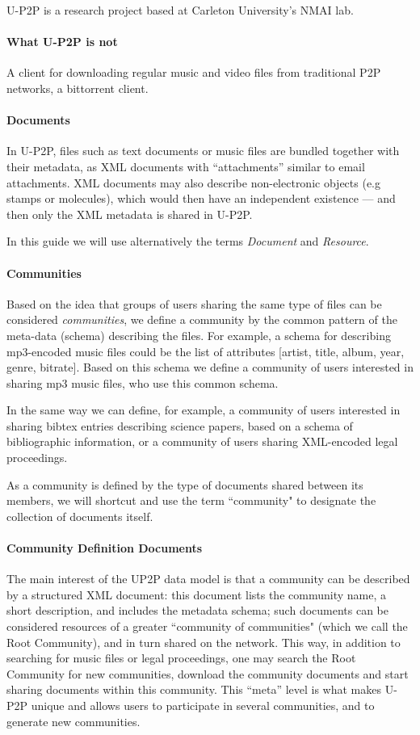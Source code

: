 \documentclass[titlepage]{article}%
\begin{document}
U-P2P is a research project based at Carleton University's NMAI lab.

\paragraph{What U-P2P is not}
A client for downloading regular music and video files from traditional P2P networks, a bittorrent client. 

\paragraph{Documents}
In U-P2P, files such as text documents or music files are bundled together with their metadata, as XML documents with ``attachments'' similar to email attachments. XML documents may also describe non-electronic objects (e.g stamps or molecules), which would then have an independent existence --- and then only the XML metadata is shared in U-P2P.

In this guide we will use alternatively the terms \emph{Document} and \emph{Resource}.

\paragraph{Communities}
Based on the idea that groups of users sharing the same type of files can be considered \emph{communities}, we define a community by the common pattern of the meta-data (schema) describing the files. For example, a schema for describing mp3-encoded music files could be the list of attributes [artist, title, album, year, genre, bitrate]. Based on this schema we define a community of users interested in sharing mp3 music files, who use this common schema.

In the same way we can define, for example, a community of users interested in sharing bibtex entries describing science papers, based on a schema of bibliographic information, or a community of users sharing XML-encoded legal proceedings.

As a community is defined by the type of documents shared between its members, we will shortcut and use the term ``community" to designate the collection of documents itself.

\paragraph{Community Definition Documents}
The main interest of the UP2P data model is that a community can be described by a structured XML document: this document lists the community name, a short description, and includes the metadata schema; such documents can be considered resources of a greater ``community of communities" (which we call the Root Community), and in turn shared on the network. This way, in addition to searching for music files or legal proceedings, one may search the Root Community for new communities, download the community documents and start sharing documents within this community. This ``meta'' level is what makes U-P2P unique and allows users to participate in several communities, and to generate new communities.
\end{document}

